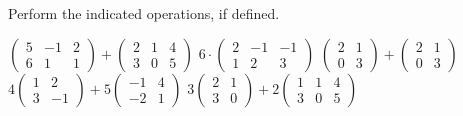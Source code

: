 \begin{exercises}
  \recommended \item
    Perform the indicated operations, if defined.
    \begin{exparts}
      \partsitem \( \begin{pmatrix}
                 5  &-1  &2  \\
                 6  &1   &1
               \end{pmatrix}
               +
               \begin{pmatrix}
                 2  &1   &4  \\
                 3  &0   &5
               \end{pmatrix}    \)
      \partsitem \( 6\cdot\begin{pmatrix}
                 2  &-1  &-1 \\
                 1  &2   &3
               \end{pmatrix}   \)
      \partsitem \( \begin{pmatrix}
                 2  &1  \\
                 0  &3
               \end{pmatrix}
               +
               \begin{pmatrix}
                 2  &1  \\
                 0  &3
               \end{pmatrix} \)
      \partsitem \( 4\begin{pmatrix}
                 1  &2  \\
                 3  &-1
               \end{pmatrix}
               +
               5\begin{pmatrix}
                -1  &4  \\
                -2  &1
               \end{pmatrix} \)
      \partsitem \( 3\begin{pmatrix}
                 2  &1  \\
                 3  &0
               \end{pmatrix}
               +2
               \begin{pmatrix}
                 1  &1  &4 \\
                 3  &0  &5
               \end{pmatrix} \)
    \end{exparts}
    \begin{answer} 
      \begin{exparts*}

\end{exparts*}
\end{answer}
\end{exercises}
